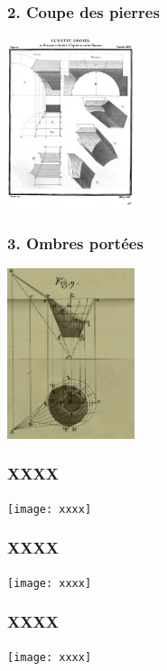 \documentclass[9pt]{beamer}
\begin{document}
\begin{frame}
\frametitle{\bf 2. Coupe des pierres}
 
\centering \includegraphics[height=5.0cm]{pierres}

\end{frame}

\begin{frame}
\frametitle{\bf 3. Ombres port\'ees}
 
\centering \includegraphics[height=5.0cm]{ombres}

\end{frame}

\begin{frame}
\frametitle{\bf XXXX}
 
\centering \texttt{[image: xxxx]}

\end{frame}

\begin{frame}
\frametitle{\bf XXXX}
 
\centering \texttt{[image: xxxx]}

\end{frame}

\begin{frame}
\frametitle{\bf XXXX}
 
\centering \texttt{[image: xxxx]}

\end{frame}
\end{document}
